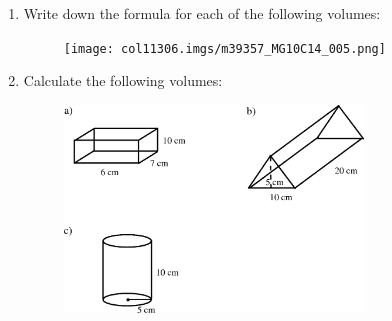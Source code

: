         \label{m39357*id63019}\begin{enumerate}[noitemsep, label=\textbf{\arabic*}. ] 
            \label{m39357*uid17}\item Write down the formula for each of the following volumes:

    \setcounter{subfigure}{0}


	\begin{figure}[H] %
    \begin{center}
    \label{m39357*id63037!!!underscore!!!media}\label{m39357*id63037!!!underscore!!!printimage}\texttt{[image: col11306.imgs/m39357\_MG10C14\_005.png]} %
        
      \vspace{2pt}
    \vspace{.1in}
    
    \end{center}

 \end{figure}   

    \addtocounter{footnote}{-0}
            \label{m39357*uid18}\item Calculate the following volumes:

    \setcounter{subfigure}{0}


	\begin{figure}[H] %
    \begin{center}
    \label{m39357*id63058!!!underscore!!!media}\label{m39357*id63058!!!underscore!!!printimage}\includegraphics[width=300px]{col11306.imgs/m39357_MG10C14_006.png} %
        
      \vspace{2pt}
    \vspace{.1in}
    
    \end{center}

 \end{figure}   


\end{enumerate}
